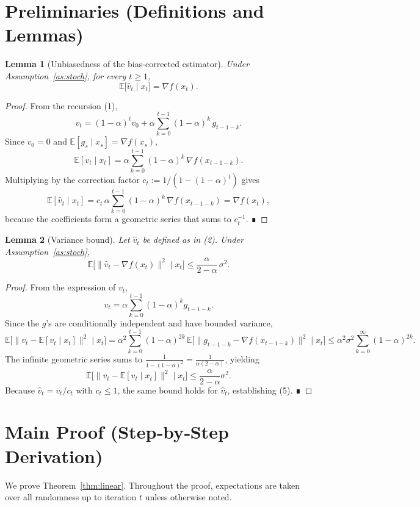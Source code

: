 \documentclass{article}
\newtheorem{lemma}{Lemma}
\newcommand{\E}{\mathbb{E}}
\begin{document}
\newpage
\section*{Preliminaries (Definitions and Lemmas)}
\begin{lemma}[Unbiasedness of the bias‑corrected estimator]\label{lem:unbiased}
Under Assumption~\ref{as:stoch}, for every $t\ge1$,
\[
\E\bigl[\widehat v_{t}\mid x_{t}\bigr]=\nabla f(x_{t}).
\]
\end{lemma}
\begin{proof}
From the recursion (1),
\[
v_{t}= (1-\alpha)^{t}v_{0}+ \alpha\sum_{k=0}^{t-1}(1-\alpha)^{k}\,g_{t-1-k}.
\]
Since $v_{0}=0$ and $\E[g_{s}\mid x_{s}]=\nabla f(x_{s})$,
\[
\E[v_{t}\mid x_{t}]
 = \alpha\sum_{k=0}^{t-1}(1-\alpha)^{k}\,\nabla f(x_{t-1-k}).
\]
Multiplying by the correction factor $c_{t}:=1/(1-(1-\alpha)^{t})$ gives
\[
\E[\widehat v_{t}\mid x_{t}]
 = c_{t}\,\alpha\sum_{k=0}^{t-1}(1-\alpha)^{k}\,\nabla f(x_{t-1-k})
 = \nabla f(x_{t}),
\]
because the coefficients form a geometric series that sums to $c_{t}^{-1}$.  ∎
\end{proof}

\begin{lemma}[Variance bound]\label{lem:var}
Let $\widehat v_{t}$ be defined as in (2). Under Assumption~\ref{as:stoch},
\[
\E\!\bigl[\|\widehat v_{t}-\nabla f(x_{t})\|^{2}\mid x_{t}\bigr]
\le
\frac{\alpha}{2-\alpha}\,\sigma^{2}.
\tag{5}
\]
\end{lemma}
\begin{proof}
From the expression of $v_{t}$,
\[
v_{t}= \alpha\sum_{k=0}^{t-1}(1-\alpha)^{k}g_{t-1-k}.
\]
Since the $g$’s are conditionally independent and have bounded variance,
\[
\E\!\bigl[\|v_{t}-\E[v_{t}\mid x_{t}]\|^{2}\mid x_{t}\bigr]
 = \alpha^{2}\sum_{k=0}^{t-1}(1-\alpha)^{2k}\,\E\!\bigl[\|g_{t-1-k}-\nabla f(x_{t-1-k})\|^{2}\mid x_{t}\bigr]
 \le \alpha^{2}\sigma^{2}\sum_{k=0}^{\infty}(1-\alpha)^{2k}.
\]
The infinite geometric series sums to $\frac{1}{1-(1-\alpha)^{2}}=\frac{1}{\alpha(2-\alpha)}$, yielding
\[
\E\!\bigl[\|v_{t}-\E[v_{t}\mid x_{t}]\|^{2}\mid x_{t}\bigr]
 \le \frac{\alpha}{2-\alpha}\sigma^{2}.
\]
Because $\widehat v_{t}=v_{t}/c_{t}$ with $c_{t}\le1$, the same bound holds for $\widehat v_{t}$, establishing (5). ∎
\end{proof}

\section*{Main Proof (Step‑by‑Step Derivation)}
We prove Theorem~\ref{thm:linear}. Throughout the proof, expectations are taken over all randomness up to iteration $t$ unless otherwise noted.
\end{document}

